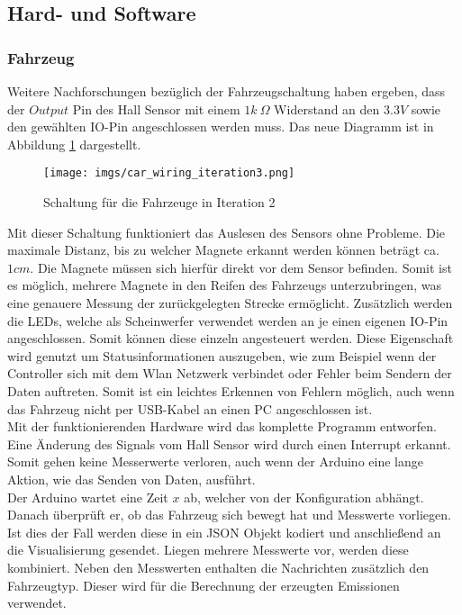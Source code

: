 \documentclass[.../Dokumentation.tex]{subfiles}
\begin{document}
    \subsection{Hard- und Software}\label{sec-ita2-hardware}
    \subsubsection*{Fahrzeug}
    Weitere Nachforschungen bezüglich der Fahrzeugschaltung haben ergeben, dass der $Output$ Pin des Hall Sensor mit einem $1k\ \Omega$  Widerstand an den $3.3V$ sowie den gewählten IO-Pin angeschlossen werden muss. Das neue Diagramm ist in Abbildung \ref{fig-hardware-car-iteration2} dargestellt.
       	\begin{figure}[H]
    	\begin{center}
    		\texttt{[image: imgs/car\_wiring\_iteration3.png]}
    		\caption{Schaltung für die Fahrzeuge in Iteration 2}
    		\label{fig-hardware-car-iteration2}
    	\end{center}
    \end{figure}
    \noindent
    Mit dieser Schaltung funktioniert das Auslesen des Sensors ohne Probleme. Die maximale Distanz, bis zu welcher Magnete erkannt werden können beträgt ca. $1 cm$. Die Magnete müssen sich hierfür direkt vor dem Sensor befinden. Somit ist es möglich, mehrere Magnete in den Reifen des Fahrzeugs unterzubringen, was eine genauere Messung der zurückgelegten Strecke ermöglicht. Zusätzlich werden die LEDs, welche als Scheinwerfer verwendet werden an je einen eigenen IO-Pin angeschlossen. Somit können diese einzeln angesteuert werden. Diese Eigenschaft wird genutzt um Statusinformationen auszugeben, wie zum Beispiel wenn der Controller sich mit dem Wlan Netzwerk verbindet oder Fehler beim Sendern der Daten auftreten. Somit ist ein leichtes Erkennen von Fehlern möglich, auch wenn das Fahrzeug nicht per USB-Kabel an einen PC angeschlossen ist.\\
    Mit der funktionierenden Hardware wird das komplette Programm entworfen. Eine Änderung des Signals vom Hall Sensor wird durch einen Interrupt erkannt. Somit gehen keine Messerwerte verloren, auch wenn der Arduino eine lange Aktion, wie das Senden von Daten, ausführt.\\
    Der Arduino wartet eine Zeit $x$ ab, welcher von der Konfiguration abhängt. Danach überprüft er, ob das Fahrzeug sich bewegt hat und Messwerte vorliegen. Ist dies der Fall werden diese in ein JSON Objekt kodiert und anschließend an die Visualisierung gesendet. Liegen mehrere Messwerte vor, werden diese kombiniert. Neben den Messwerten enthalten die Nachrichten zusätzlich den Fahrzeugtyp. Dieser wird für die Berechnung der erzeugten Emissionen verwendet.\\
\end{document}
